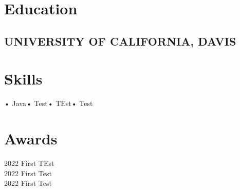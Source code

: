 \documentclass[]{deedy-resume-openfont}
\begin{document}
	\begin{minipage}[t]{0.33\textwidth}

		\section{Education}
		\begin{education}
			\subsection*{UNIVERSITY OF CALIFORNIA, DAVIS\\}   
		\end{education}
		\sectionsep


		\section{Skills}
		\begin{skills}
			• Java• Test• TEst• Test
		\end{skills}
		\sectionsep


		\section{Awards}
		\begin{awards}
			2022 First TEst\\2022 First Test\\2022 First Test\\
		\end{awards}
		\sectionsep

	\end{minipage}
\end{document}
